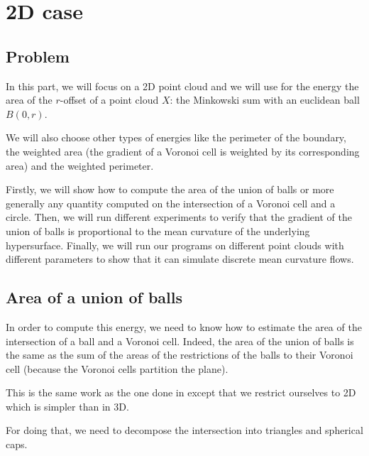 \chapter{2D case}

\section{Problem}

In this part, we will focus on a 2D point cloud and we will use for the energy
the area of the $ r $-offset of a point cloud $ X $: the Minkowski sum with an
euclidean ball $ B(0, r) $.

We will also choose other types of energies like the perimeter of the boundary,
the weighted area (the gradient of a Voronoi cell is weighted by its
corresponding area) and the weighted perimeter.

Firstly, we will show how to compute the area of the union of balls or more
generally any quantity computed on the intersection of a Voronoi cell and a
circle. Then, we will run different experiments to verify that the gradient of
the union of balls is proportional to the mean curvature of the underlying
hypersurface. Finally, we will run our programs on different point clouds with
different parameters to show that it can simulate discrete mean curvature flows.

\section{Area of a union of balls}

In order to compute this energy, we need to know how to estimate the area of the
intersection of a ball and a Voronoi cell. Indeed, the area of the union of
balls is the same as the sum of the areas of the restrictions of the balls to
their Voronoi cell (because the Voronoi cells partition the plane).

This is the same work as the one done in \cite{cazals2011computing} except that
we restrict ourselves to 2D which is simpler than in 3D.

For doing that, we need to decompose the intersection into triangles and
spherical caps.

